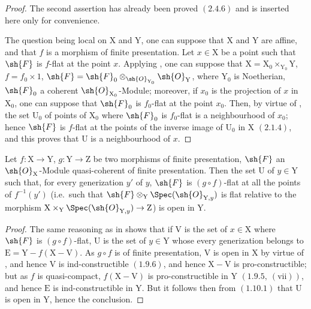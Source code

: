 \begin{proof}
The second assertion has already been proved $(2.4.6)$ and is inserted here only for convenience.

The question being local on $\mathrm{X}$ and $\mathrm{Y}$, one can suppose that $\mathrm{X}$ and $\mathrm{Y}$ are affine, and that $f$ is a morphism of finite presentation. Let $x\in\mathrm{X}$ be a point such that $\sh{F}$ is $f$-flat at the point $x$. Applying , one can suppose that $\mathrm{X}=\mathrm{X}_0\times_{\mathrm{Y}_0}\mathrm{Y}$, $f=f_0\times 1$, $\sh{F}=\sh{F}_0\otimes_{\sh{O}_{\mathrm{Y}_0}}\sh{O}_\mathrm{Y}$, where $\mathrm{Y}_0$ is Noetherian, $\sh{F}_0$ a coherent $\sh{O}_{\mathrm{X}_0}$-Module; moreover, if $x_0$ is the projection of $x$ in $\mathrm{X}_0$, one can suppose that $\sh{F}_0$ is $f_0$-flat at the point $x_0$. Then, by virtue of , the set $\mathrm{U}_0$ of points of $\mathrm{X}_0$ where $\sh{F}_0$ is $f_0$-flat is a neighbourhood of $x_0$; hence $\sh{F}$ is $f$-flat at the points of the inverse image of $\mathrm{U}_0$ in $\mathrm{X}$ $(2.1.4)$, and this proves that $\mathrm{U}$ is a neighbourhood of $x$.
\end{proof}


\begin{corollary}[11.3.2]
\label{IV.11.3.2}
Let $f:\mathrm{X}\to\mathrm{Y}$, $g:\mathrm{Y}\to\mathrm{Z}$ be two morphisms of finite presentation, $\sh{F}$ an $\sh{O}_\mathrm{X}$-Module quasi-coherent of finite presentation. Then the set $\mathrm{U}$ of $y\in\mathrm{Y}$ such that, for every generization $y'$ of $y$, $\sh{F}$ is $(g\circ f)$-flat at all the points of $f^{-1}(y')$ (i.e.\ such that $\sh{F}\otimes_\mathrm{Y}\Spec(\sh{O}_{\mathrm{Y},y})$ is flat relative to the morphism $\mathrm{X}\times_\mathrm{Y}\Spec(\sh{O}_{\mathrm{Y},y})\to\mathrm{Z}$) is open in $\mathrm{Y}$.
\end{corollary}

\begin{proof}
The same reasoning as in  shows that if $\mathrm{V}$ is the set of $x\in\mathrm{X}$ where $\sh{F}$ is $(g\circ f)$-flat, $\mathrm{U}$ is the set of $y\in\mathrm{Y}$ whose every generization belongs to $\mathrm{E}=\mathrm{Y}-f(\mathrm{X}-\mathrm{V})$. As $g\circ f$ is of finite presentation, $\mathrm{V}$ is open in $\mathrm{X}$ by virtue of , and hence $\mathrm{V}$ is ind-constructible $(1.9.6)$, and hence $\mathrm{X}-\mathrm{V}$ is pro-constructible; but as $f$ is quasi-compact, $f(\mathrm{X}-\mathrm{V})$ is pro-constructible in $\mathrm{Y}$ $(1.9.5,~(\mathrm{vii}))$, and hence $\mathrm{E}$ is ind-constructible in $\mathrm{Y}$. But it follows then from $(1.10.1)$ that $\mathrm{U}$ is open in $\mathrm{Y}$, hence the conclusion.
\end{proof}

